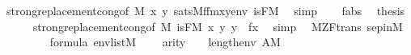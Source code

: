 \begin{isabellebody}
\ strong{\isacharunderscore}{\kern0pt}replacement{\isacharunderscore}{\kern0pt}cong{\isacharbrackleft}{\kern0pt}of\ {\isachardoublequoteopen}{\isacharhash}{\kern0pt}{\isacharhash}{\kern0pt}M{\isachardoublequoteclose}\ {\isachardoublequoteopen}{\isasymlambda}x\ y{\isachardot}{\kern0pt}\ sats{\isacharparenleft}{\kern0pt}M{\isacharcomma}{\kern0pt}f{\isacharunderscore}{\kern0pt}fm{\isacharcomma}{\kern0pt}{\isacharbrackleft}{\kern0pt}x{\isacharcomma}{\kern0pt}y{\isacharbrackright}{\kern0pt}{\isacharat}{\kern0pt}env{\isacharparenright}{\kern0pt}{\isachardoublequoteclose}\ {\isachardoublequoteopen}is{\isacharunderscore}{\kern0pt}F{\isacharparenleft}{\kern0pt}{\isacharhash}{\kern0pt}{\isacharhash}{\kern0pt}M{\isacharparenright}{\kern0pt}{\isachardoublequoteclose}{\isacharbrackright}{\kern0pt}\ \isamarkupfalse%
\ simp\isanewline
\ \ \isamarkupfalse%
\ f{\isacharunderscore}{\kern0pt}abs\ \isamarkupfalse%
\ {\isacharquery}{\kern0pt}thesis\isanewline
\ \ \ \ \isamarkupfalse%
\ strong{\isacharunderscore}{\kern0pt}replacement{\isacharunderscore}{\kern0pt}cong{\isacharbrackleft}{\kern0pt}of\ {\isachardoublequoteopen}{\isacharhash}{\kern0pt}{\isacharhash}{\kern0pt}M{\isachardoublequoteclose}\ {\isachardoublequoteopen}is{\isacharunderscore}{\kern0pt}F{\isacharparenleft}{\kern0pt}{\isacharhash}{\kern0pt}{\isacharhash}{\kern0pt}M{\isacharparenright}{\kern0pt}{\isachardoublequoteclose}\ {\isachardoublequoteopen}{\isasymlambda}x\ y{\isachardot}{\kern0pt}\ y\ {\isacharequal}{\kern0pt}\ f{\isacharparenleft}{\kern0pt}x{\isacharparenright}{\kern0pt}{\isachardoublequoteclose}{\isacharbrackright}{\kern0pt}\ \isamarkupfalse%
\ simp\isanewline
{}\isamarkupfalse%
%
\endisatagproof
{\isafoldproof}%
%
\isadelimproof
\isanewline
%
\endisadelimproof
\isanewline
\isanewline
{}\isamarkupfalse%
\ {\isacharparenleft}{\kern0pt}\ M{\isacharunderscore}{\kern0pt}ZF{\isacharunderscore}{\kern0pt}trans{\isacharparenright}{\kern0pt}\ sep{\isacharunderscore}{\kern0pt}in{\isacharunderscore}{\kern0pt}M\ {\isacharcolon}{\kern0pt}\isanewline
\ \ \isanewline
\ \ \ \ {\isachardoublequoteopen}{\isasymphi}\ {\isasymin}\ formula{\isachardoublequoteclose}\ {\isachardoublequoteopen}env{\isasymin}list{\isacharparenleft}{\kern0pt}M{\isacharparenright}{\kern0pt}{\isachardoublequoteclose}\isanewline
\ \ \ \ {\isachardoublequoteopen}arity{\isacharparenleft}{\kern0pt}{\isasymphi}{\isacharparenright}{\kern0pt}\ {\isasymle}\ {}\ {\isacharhash}{\kern0pt}{\isacharplus}{\kern0pt}\ length{\isacharparenleft}{\kern0pt}env{\isacharparenright}{\kern0pt}{\isachardoublequoteclose}\ {\isachardoublequoteopen}A{\isasymin}M{\isachardoublequoteclose}\ \isanewline

\end{isabellebody}
